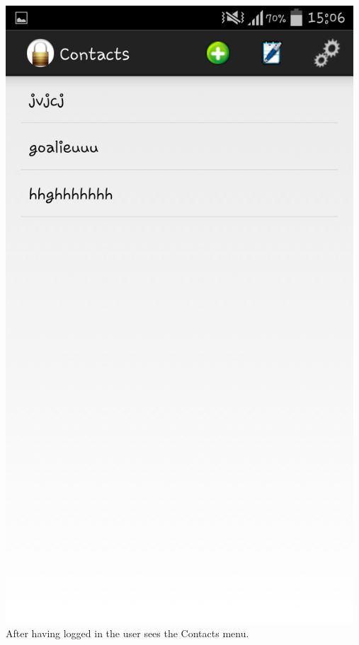 \begin{center}
 \includegraphics[width=13cm]{screenshots/normal/3_ContactScreen.png}
\textbf{\\}
 After having logged in the user sees the Contacts menu.
\end{center}
